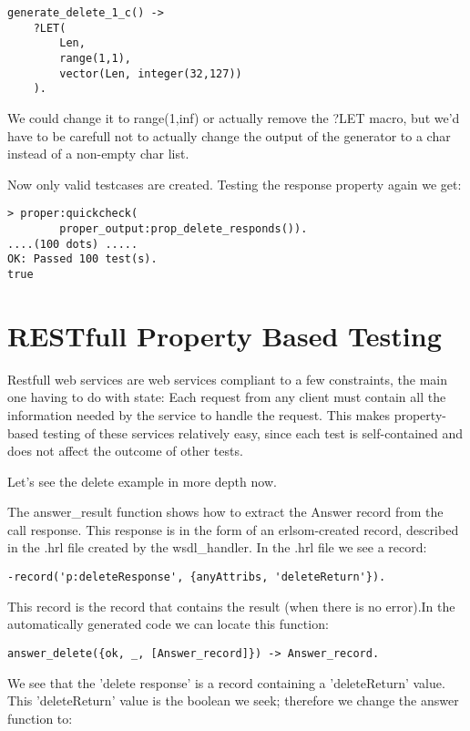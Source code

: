 \documentclass[submission,copyright]{eptcs}
\begin{document}
\begin{lstlisting}
generate_delete_1_c() -> 
	?LET(
		Len, 
		range(1,1), 
		vector(Len, integer(32,127))
	).
\end{lstlisting}
We could change it to range(1,inf) or actually remove the ?LET macro, but we'd have to be carefull not to actually change the output of the generator to a char instead of a non-empty char list.

Now only valid testcases are created. Testing the response property again we get:
\begin{lstlisting}
> proper:quickcheck(
        proper_output:prop_delete_responds()).
....(100 dots) .....
OK: Passed 100 test(s).
true
\end{lstlisting}

\section{RESTfull Property Based Testing}

Restfull web services are web services compliant to a few constraints, the main one having to do with state: Each request from any client must contain all the information needed by the service to handle the request. This makes property-based testing of these services relatively easy, since each test is self-contained and does not affect the outcome of other tests. 

Let's see the delete example in more depth now. 

The answer\_result function shows how to extract the Answer record from the call response. This response is in the form of an erlsom-created record, described in the .hrl file created by the wsdl\_handler. In the .hrl file we see a record: 
\begin{lstlisting}
-record('p:deleteResponse', {anyAttribs, 'deleteReturn'}).
\end{lstlisting}

This record is the record that contains the result (when there is no error).In the automatically generated code we can locate this function:

\begin{lstlisting}
answer_delete({ok, _, [Answer_record]}) -> Answer_record.
\end{lstlisting}

We see that the 'delete response' is a record containing a 'deleteReturn' value. This 'deleteReturn' value is the boolean we seek; therefore we change the answer function to:
\end{document}
